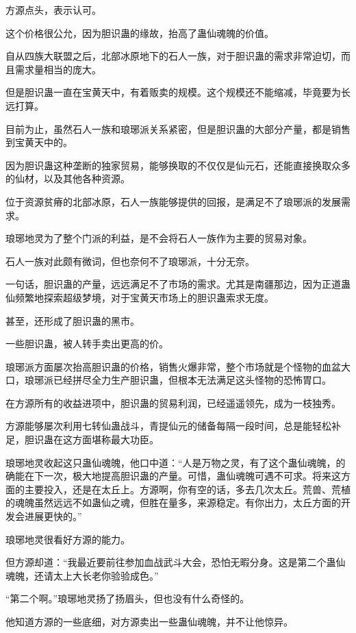 
\begin{this_body}

方源点头，表示认可。

这个价格很公允，因为胆识蛊的缘故，抬高了蛊仙魂魄的价值。

自从四族大联盟之后，北部冰原地下的石人一族，对于胆识蛊的需求非常迫切，而且需求量相当的庞大。

但是胆识蛊一直在宝黄天中，有着贩卖的规模。这个规模还不能缩减，毕竟要为长远打算。

目前为止，虽然石人一族和琅琊派关系紧密，但是胆识蛊的大部分产量，都是销售到宝黄天中的。

因为胆识蛊这种垄断的独家贸易，能够换取的不仅仅是仙元石，还能直接换取众多的仙材，以及其他各种资源。

位于资源贫瘠的北部冰原，石人一族能够提供的回报，是满足不了琅琊派的发展需求。

琅琊地灵为了整个门派的利益，是不会将石人一族作为主要的贸易对象。

石人一族对此颇有微词，但也奈何不了琅琊派，十分无奈。

一句话，胆识蛊的产量，远远满足不了市场的需求。尤其是南疆那边，因为正道蛊仙频繁地探索超级梦境，对于宝黄天市场上的胆识蛊索求无度。

甚至，还形成了胆识蛊的黑市。

一些胆识蛊，被人转手卖出更高的价。

琅琊派方面屡次抬高胆识蛊的价格，销售火爆非常，整个市场就是个怪物的血盆大口，琅琊派已经拼尽全力生产胆识蛊，但根本无法满足这头怪物的恐怖胃口。

在方源所有的收益进项中，胆识蛊的贸易利润，已经遥遥领先，成为一枝独秀。

方源能够屡次利用七转仙蛊战斗，青提仙元的储备每隔一段时间，总是能轻松补足，胆识蛊在这方面堪称最大功臣。

琅琊地灵收起这只蛊仙魂魄，他口中道：“人是万物之灵，有了这个蛊仙魂魄，的确能在下一次，极大地提高胆识蛊的产量。可惜，蛊仙魂魄可遇不可求。将来这方面的主要投入，还是在太丘上。方源啊，你有空的话，多去几次太丘。荒兽、荒植的魂魄虽然远远不如蛊仙之魂，但胜在量多，来源稳定。有你出力，太丘方面的开发会进展更快的。”

琅琊地灵很看好方源的能力。

但方源却道：“我最近要前往参加血战武斗大会，恐怕无暇分身。这是第二个蛊仙魂魄，还请太上大长老你验验成色。”

“第二个啊。”琅琊地灵扬了扬眉头，但也没有什么奇怪的。

他知道方源的一些底细，对方源卖出一些蛊仙魂魄，并不让他惊异。


\end{this_body}
